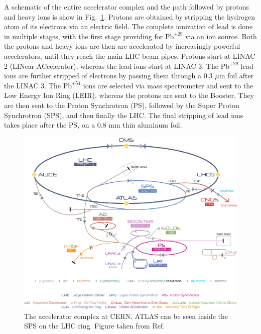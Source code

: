 A schematic of the entire accelerator complex and the path followed by protons and heavy ions is show in Fig.~\ref{fig:cern}.  Protons are obtained by stripping the hydrogen atom of its electrons via an electric field. The complete ionization of lead is done in multiple stages, with the first stage providing for $\mathrm{Pb}^{+29}$ via an ion source. Both the protons and heavy ions are then are accelerated by increasingly powerful accelerators, until they reach the main LHC beam pipes. Protons start at LINAC 2 (LINear ACcelerator), whereas the lead ions start at LINAC 3. The $\mathrm{Pb}^{+29}$ lead ions are further stripped of electrons by passing them through a 0.3 $\mu$m foil after the LINAC 3. The $\mathrm{Pb}^{+54}$ ions are selected via mass spectrometer and sent to the Low Energy Ion Ring (LEIR), whereas the protons are sent to the Booster. They are then sent to the Proton Synchrotron (PS), followed by the Super Proton Synchrotron (SPS), and then finally the LHC. The final stripping of lead ions takes place after the PS, on a 0.8 mm thin aluminum foil.


\begin{figure}[ht]
	\centering
	\includegraphics[width=1.\textwidth]{figures/cern.jpg} %
	\caption{The accelerator complex at CERN. ATLAS can be seen inside the SPS on the LHC ring. Figure taken from Ref.~\cite{TEEPCLPC}}
	\label{fig:cern}%
\end{figure}


